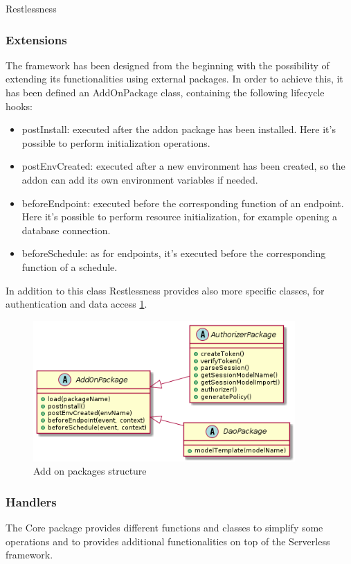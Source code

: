 \begin{chapter}{Restlessness}
    \subsubsection{Extensions}
    The framework has been designed from the beginning with the possibility of
    extending its functionalities using external packages.
    In order to achieve this, it has been defined an AddOnPackage class, containing
    the following lifecycle hooks:
    \begin{itemize}
        \item postInstall: executed after the addon package has been installed.
            Here it's possible to perform initialization operations.
        \item postEnvCreated: executed after a new environment has been created,
            so the addon can add its own environment variables if needed.
        \item beforeEndpoint: executed before the corresponding function of an
            endpoint. Here it's possible to perform resource initialization,
            for example opening a database connection.
        \item beforeSchedule: as for endpoints, it's executed before the
            corresponding function of a schedule.
    \end{itemize}
    In addition to this class Restlessness provides also more specific classes,
    for authentication and data access \ref{fig:rln_add_on_packages}.

    \begin{figure}
        \centering
        \includegraphics[width=10cm]{source/diagrams/rln_add_on_package.png}
        \caption{Add on packages structure}
        \label{fig:rln_add_on_packages}
    \end{figure}

    \subsubsection{Handlers}
    The Core package provides different functions and classes to simplify some
    operations and to provides additional functionalities on top of the Serverless
    framework.


\end{chapter}
